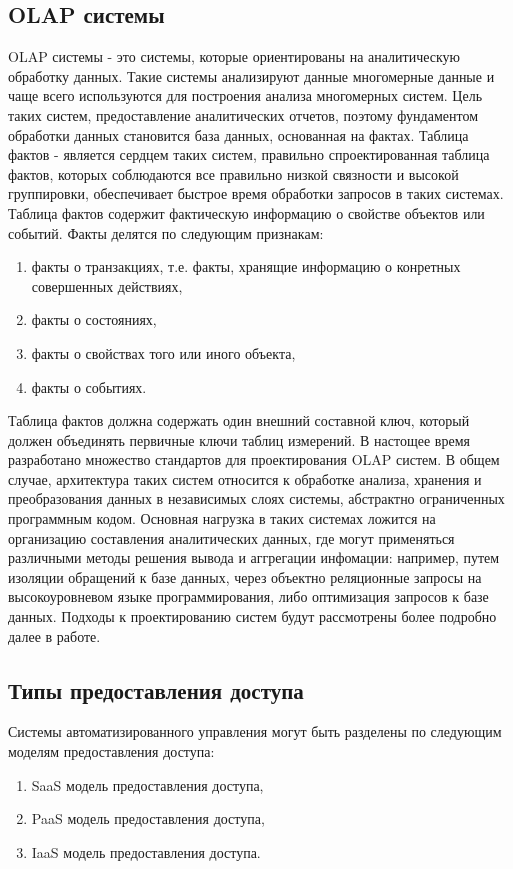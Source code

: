 \subsection{OLAP системы}\label{sec:ch2/sec1/sub3}
OLAP системы - это системы, которые ориентированы на аналитическую обработку данных. Такие системы анализируют данные многомерные данные и чаще всего используются для построения анализа многомерных систем.
Цель таких систем, предоставление аналитических отчетов, поэтому фундаментом обработки данных становится база данных, основанная на фактах. Таблица фактов - является сердцем таких систем, правильно спроектированная таблица фактов, которых соблюдаются все правильно низкой связности и высокой группировки, обеспечивает быстрое время обработки запросов в таких системах. 
Таблица фактов содержит фактическую информацию о свойстве объектов или событий. Факты делятся по следующим признакам:
\begin{enumerate}
	\item факты о транзакциях, т.е. факты, хранящие информацию о конретных совершенных действиях, 
	\item факты о состояниях,
	\item факты о свойствах того или иного объекта,
	\item факты о событиях.
\end{enumerate}
Таблица фактов должна содержать один внешний составной ключ, который должен объединять первичные ключи таблиц измерений. В настощее время разработано множество стандартов для проектирования OLAP систем. В общем случае, архитектура таких систем относится к обработке анализа, хранения и преобразования данных в независимых слоях системы, абстрактно ограниченных программным кодом. Основная нагрузка в таких системах ложится на организацию составления аналитических данных, где могут применяться различными методы решения вывода и аггрегации инфомации: например, путем изоляции обращений к базе данных, через объектно реляционные запросы на высокоуровневом языке программирования, либо оптимизация запросов к базе данных. 
Подходы к проектированию систем будут рассмотрены более подробно далее в работе.

\subsection{Типы предоставления доступа}\label{sec:ch2/sec1/sub1}
Системы автоматизированного управления могут быть разделены по следующим моделям предоставления доступа:
\begin{enumerate}
	\item SaaS модель предоставления доступа,
	\item PaaS модель предоставления доступа,
	\item IaaS модель предоставления доступа.
\end{enumerate}

